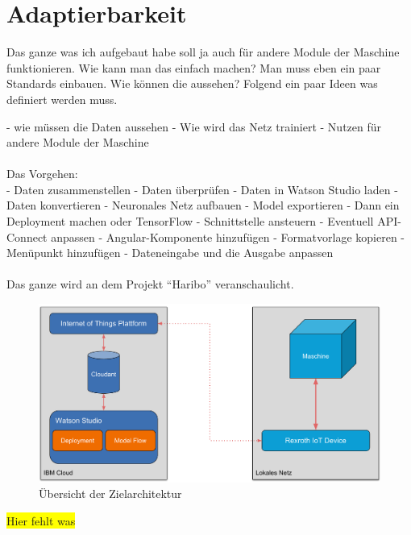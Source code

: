 \chapter{Adaptierbarkeit}
Das ganze was ich aufgebaut habe soll ja auch für andere Module der Maschine funktionieren. Wie kann man das einfach
machen? Man muss eben ein paar Standards einbauen. Wie können die aussehen? Folgend ein paar Ideen was definiert werden
muss.

- wie müssen die Daten aussehen
- Wie wird das Netz trainiert
- Nutzen für andere Module der Maschine\\ \\

Das Vorgehen: \\
- Daten zusammenstellen
- Daten überprüfen
- Daten in Watson Studio laden
- Daten konvertieren
- Neuronales Netz aufbauen
- Model exportieren
- Dann ein Deployment machen oder TensorFlow
- Schnittstelle ansteuern
- Eventuell API-Connect anpassen
- Angular-Komponente hinzufügen
- Formatvorlage kopieren
- Menüpunkt hinzufügen
- Dateneingabe und die Ausgabe anpassen\\ \\

Das ganze wird an dem Projekt \enquote{Haribo} veranschaulicht.

\begin{figure}[h]
    \centering
    \includegraphics[scale=0.5]{images/kapitel_5/architektur_uebersicht.pdf}
    \caption{Übersicht der Zielarchitektur}
    \label{fig:umsetzung_zielarchitektur_5}
\end{figure}

\colorbox{yellow}{Hier fehlt was}